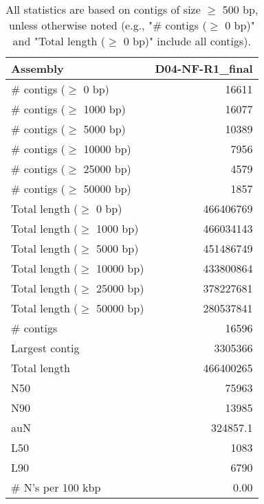 \documentclass[12pt,a4paper]{article}
\begin{document}
\begin{table}[ht]
\begin{center}
\caption{All statistics are based on contigs of size $\geq$ 500 bp, unless otherwise noted (e.g., "\# contigs ($\geq$ 0 bp)" and "Total length ($\geq$ 0 bp)" include all contigs).}
\begin{tabular}{|l*{1}{|r}|}
\hline
Assembly & D04-NF-R1\_final \\ \hline
\# contigs ($\geq$ 0 bp) & 16611 \\ \hline
\# contigs ($\geq$ 1000 bp) & 16077 \\ \hline
\# contigs ($\geq$ 5000 bp) & 10389 \\ \hline
\# contigs ($\geq$ 10000 bp) & 7956 \\ \hline
\# contigs ($\geq$ 25000 bp) & 4579 \\ \hline
\# contigs ($\geq$ 50000 bp) & 1857 \\ \hline
Total length ($\geq$ 0 bp) & 466406769 \\ \hline
Total length ($\geq$ 1000 bp) & 466034143 \\ \hline
Total length ($\geq$ 5000 bp) & 451486749 \\ \hline
Total length ($\geq$ 10000 bp) & 433800864 \\ \hline
Total length ($\geq$ 25000 bp) & 378227681 \\ \hline
Total length ($\geq$ 50000 bp) & 280537841 \\ \hline
\# contigs & 16596 \\ \hline
Largest contig & 3305366 \\ \hline
Total length & 466400265 \\ \hline
N50 & 75963 \\ \hline
N90 & 13985 \\ \hline
auN & 324857.1 \\ \hline
L50 & 1083 \\ \hline
L90 & 6790 \\ \hline
\# N's per 100 kbp & 0.00 \\ \hline
\end{tabular}
\end{center}
\end{table}
\end{document}
